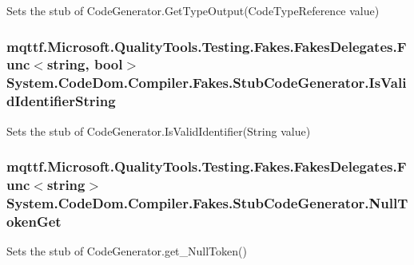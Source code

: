 Sets the stub of Code\-Generator.\-Get\-Type\-Output(\-Code\-Type\-Reference value)

\hypertarget{class_system_1_1_code_dom_1_1_compiler_1_1_fakes_1_1_stub_code_generator_a079d7bea677f150552a5e9d486c56186}{
\subsubsection[{Is\-Valid\-Identifier\-String}]{\setlength{\rightskip}{0pt plus 5cm}mqttf.\-Microsoft.\-Quality\-Tools.\-Testing.\-Fakes.\-Fakes\-Delegates.\-Func$<$string, bool$>$ System.\-Code\-Dom.\-Compiler.\-Fakes.\-Stub\-Code\-Generator.\-Is\-Valid\-Identifier\-String}}\label{class_system_1_1_code_dom_1_1_compiler_1_1_fakes_1_1_stub_code_generator_a079d7bea677f150552a5e9d486c56186}


Sets the stub of Code\-Generator.\-Is\-Valid\-Identifier(\-String value)

\hypertarget{class_system_1_1_code_dom_1_1_compiler_1_1_fakes_1_1_stub_code_generator_abe744347bbb07b855f31eab972c3ecdb}{
\subsubsection[{Null\-Token\-Get}]{\setlength{\rightskip}{0pt plus 5cm}mqttf.\-Microsoft.\-Quality\-Tools.\-Testing.\-Fakes.\-Fakes\-Delegates.\-Func$<$string$>$ System.\-Code\-Dom.\-Compiler.\-Fakes.\-Stub\-Code\-Generator.\-Null\-Token\-Get}}\label{class_system_1_1_code_dom_1_1_compiler_1_1_fakes_1_1_stub_code_generator_abe744347bbb07b855f31eab972c3ecdb}


Sets the stub of Code\-Generator.\-get\-\_\-\-Null\-Token()

